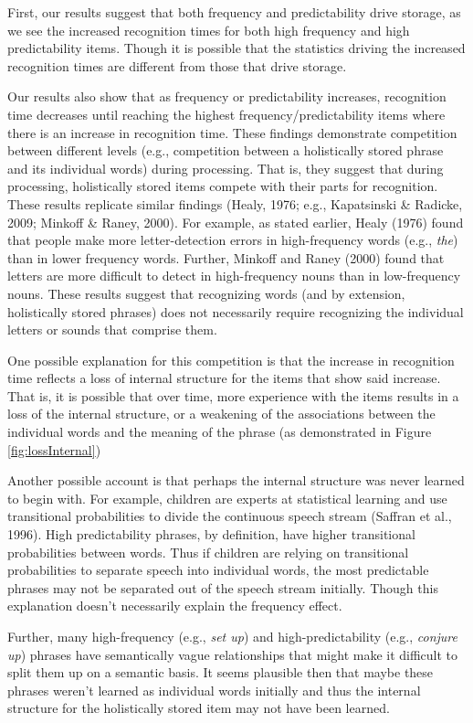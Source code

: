 \documentclass[
  man,floatsintext]{apa6}
\begin{document}
First, our results suggest that both frequency and predictability drive storage, as we see the increased recognition times for both high frequency and high predictability items. Though it is possible that the statistics driving the increased recognition times are different from those that drive storage.

Our results also show that as frequency or predictability increases, recognition time decreases until reaching the highest frequency/predictability items where there is an increase in recognition time. These findings demonstrate competition between different levels (e.g., competition between a holistically stored phrase and its individual words) during processing. That is, they suggest that during processing, holistically stored items compete with their parts for recognition. These results replicate similar findings (Healy, 1976; e.g., Kapatsinski \& Radicke, 2009; Minkoff \& Raney, 2000). For example, as stated earlier, Healy (1976) found that people make more letter-detection errors in high-frequency words (e.g., \emph{the}) than in lower frequency words. Further, Minkoff and Raney (2000) found that letters are more difficult to detect in high-frequency nouns than in low-frequency nouns. These results suggest that recognizing words (and by extension, holistically stored phrases) does not necessarily require recognizing the individual letters or sounds that comprise them.

One possible explanation for this competition is that the increase in recognition time reflects a loss of internal structure for the items that show said increase. That is, it is possible that over time, more experience with the items results in a loss of the internal structure, or a weakening of the associations between the individual words and the meaning of the phrase (as demonstrated in Figure \ref{fig:lossInternal})

Another possible account is that perhaps the internal structure was never learned to begin with. For example, children are experts at statistical learning and use transitional probabilities to divide the continuous speech stream (Saffran et al., 1996). High predictability phrases, by definition, have higher transitional probabilities between words. Thus if children are relying on transitional probabilities to separate speech into individual words, the most predictable phrases may not be separated out of the speech stream initially. Though this explanation doesn't necessarily explain the frequency effect.

Further, many high-frequency (e.g., \emph{set up}) and high-predictability (e.g., \emph{conjure up}) phrases have semantically vague relationships that might make it difficult to split them up on a semantic basis. It seems plausible then that maybe these phrases weren't learned as individual words initially and thus the internal structure for the holistically stored item may not have been learned.
\end{document}
